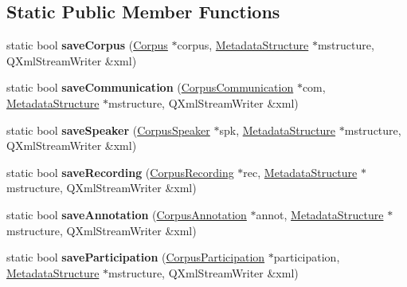 \subsection*{Static Public Member Functions}
\begin{DoxyCompactItemize}
\item 
\mbox{\label{class_x_m_l_serialiser_metadata_ae3411e55318d1f5cd8f517386fda70c5}} 
static bool {\bfseries save\+Corpus} (\hyperlink{class_corpus}{Corpus} $\ast$corpus, \hyperlink{class_metadata_structure}{Metadata\+Structure} $\ast$mstructure, Q\+Xml\+Stream\+Writer \&xml)
\item 
\mbox{\label{class_x_m_l_serialiser_metadata_aada501f9e3df53e8a232b6eab3a27d9f}} 
static bool {\bfseries save\+Communication} (\hyperlink{class_corpus_communication}{Corpus\+Communication} $\ast$com, \hyperlink{class_metadata_structure}{Metadata\+Structure} $\ast$mstructure, Q\+Xml\+Stream\+Writer \&xml)
\item 
\mbox{\label{class_x_m_l_serialiser_metadata_a98ed3150c4f6c609fc13c94294271fc3}} 
static bool {\bfseries save\+Speaker} (\hyperlink{class_corpus_speaker}{Corpus\+Speaker} $\ast$spk, \hyperlink{class_metadata_structure}{Metadata\+Structure} $\ast$mstructure, Q\+Xml\+Stream\+Writer \&xml)
\item 
\mbox{\label{class_x_m_l_serialiser_metadata_ab9081ad4880c4945a7076bbec094de9d}} 
static bool {\bfseries save\+Recording} (\hyperlink{class_corpus_recording}{Corpus\+Recording} $\ast$rec, \hyperlink{class_metadata_structure}{Metadata\+Structure} $\ast$mstructure, Q\+Xml\+Stream\+Writer \&xml)
\item 
\mbox{\label{class_x_m_l_serialiser_metadata_a7dd1e2334d6828aabb0a1120d43c7581}} 
static bool {\bfseries save\+Annotation} (\hyperlink{class_corpus_annotation}{Corpus\+Annotation} $\ast$annot, \hyperlink{class_metadata_structure}{Metadata\+Structure} $\ast$mstructure, Q\+Xml\+Stream\+Writer \&xml)
\item 
\mbox{\label{class_x_m_l_serialiser_metadata_add5dce796324de5488ee466b32e013c5}} 
static bool {\bfseries save\+Participation} (\hyperlink{class_corpus_participation}{Corpus\+Participation} $\ast$participation, \hyperlink{class_metadata_structure}{Metadata\+Structure} $\ast$mstructure, Q\+Xml\+Stream\+Writer \&xml)

\end{DoxyCompactItemize}

